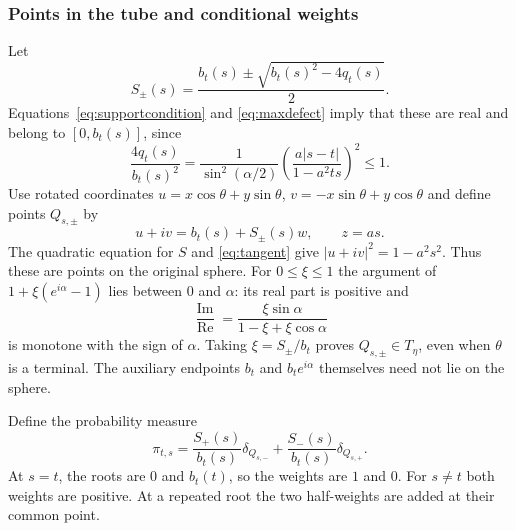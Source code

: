 \documentclass[11pt,a4paper]{article}
\begin{document}
\subsubsection{Points in the tube and conditional weights}
Let
\begin{equation}\label{eq:roots}
 S_\pm(s)=\frac{b_t(s)\pm\sqrt{b_t(s)^2-4q_t(s)}}2.
\end{equation}
Equations~\eqref{eq:supportcondition} and \eqref{eq:maxdefect} imply
that these are real and belong to $[0,b_t(s)]$, since
\[
 \frac{4q_t(s)}{b_t(s)^2}
 =\frac{1}{\sin^2(\alpha/2)}
   \left(\frac{a|s-t|}{1-a^2ts}\right)^2\le1.
\]
Use rotated coordinates $u=x\cos\theta+y\sin\theta$,
$v=-x\sin\theta+y\cos\theta$ and define points $Q_{s,\pm}$ by
\begin{equation}\label{eq:atoms}
 u+iv=b_t(s)+S_\pm(s)w,\qquad z=as.
\end{equation}
The quadratic equation for $S$ and \eqref{eq:tangent} give
$|u+iv|^2=1-a^2s^2$. Thus these are points on the original sphere.
For $0\le\xi\le1$ the argument of $1+\xi(e^{i\alpha}-1)$ lies
between $0$ and $\alpha$: its real part is positive and
\[
 \frac{\operatorname{Im}}{\operatorname{Re}}
 =\frac{\xi\sin\alpha}{1-\xi+\xi\cos\alpha}
\]
is monotone with the sign of $\alpha$. Taking $\xi=S_\pm/b_t$
proves $Q_{s,\pm}\in T_\eta$, even when $\theta$ is a terminal.
The auxiliary endpoints $b_t$ and $b_te^{i\alpha}$ themselves need
not lie on the sphere.

Define the probability measure
\begin{equation}\label{eq:conditional}
 \pi_{t,s}=\frac{S_+(s)}{b_t(s)}\delta_{Q_{s,-}}
                +\frac{S_-(s)}{b_t(s)}\delta_{Q_{s,+}}.
\end{equation}
At $s=t$, the roots are $0$ and $b_t(t)$, so the weights are $1$ and $0$.
For $s\ne t$ both weights are positive. At a repeated root the two
half-weights are added at their common point.
\end{document}
